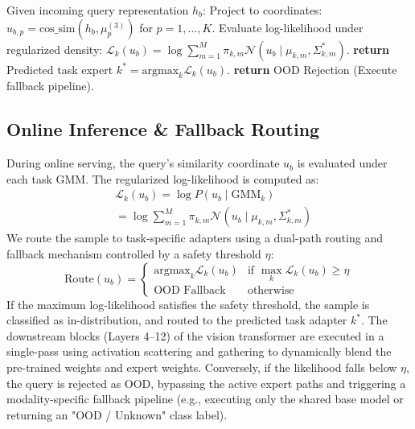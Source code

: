 \begin{algorithm}[tb]
\begin{algorithmic}[1]
   \STATE {}
   \STATE Given incoming query representation $h_b$:
   \STATE Project to coordinates: $u_{b, p} = \text{cos\_sim}(h_b, \mu^{(3)}_p)$ for $p = 1, \dots, K$.
       \STATE Evaluate log-likelihood under regularized density:
       \STATE \quad $\mathcal{L}_k(u_b) = \log \sum_{m=1}^M \pi_{k, m} \mathcal{N}(u_b \mid \mu_{k, m}, \Sigma^{*}_{k, m})$.
   \ENDFOR
       \STATE \textbf{return} Predicted task expert $k^* = \text{argmax}_k \mathcal{L}_k(u_b)$.
   \ELSE
       \STATE \textbf{return} OOD Rejection (Execute fallback pipeline).
   \ENDIF
\end{algorithmic}
\end{algorithm}

\subsection{Online Inference \& Fallback Routing}
During online serving, the query's similarity coordinate $u_b$ is evaluated under each task GMM. The regularized log-likelihood is computed as:
\begin{equation}
\begin{split}
    &\mathcal{L}_k(u_b) = \log P(u_b \mid \text{GMM}_k) \\
    &= \log \sum_{m=1}^M \pi_{k, m} \mathcal{N}(u_b \mid \mu_{k, m}, \Sigma^{*}_{k, m})
\end{split}
\end{equation}
We route the sample to task-specific adapters using a dual-path routing and fallback mechanism controlled by a safety threshold $\eta$:
\begin{equation}
    \text{Route}(u_b) = \begin{cases}
        \text{argmax}_k \mathcal{L}_k(u_b) & \text{if } \max_k \mathcal{L}_k(u_b) \ge \eta \\
        \text{OOD Fallback} & \text{otherwise}
    \end{cases}
\end{equation}
If the maximum log-likelihood satisfies the safety threshold, the sample is classified as in-distribution, and routed to the predicted task adapter $k^*$. The downstream blocks (Layers 4--12) of the vision transformer are executed in a single-pass using activation scattering and gathering to dynamically blend the pre-trained weights and expert weights. Conversely, if the likelihood falls below $\eta$, the query is rejected as OOD, bypassing the active expert paths and triggering a modality-specific fallback pipeline (e.g., executing only the shared base model or returning an "OOD / Unknown" class label).

